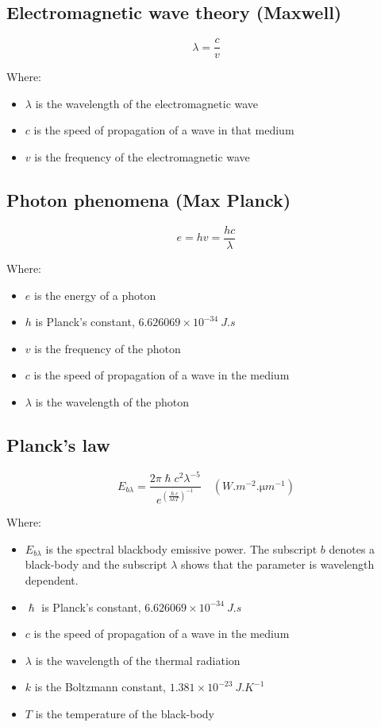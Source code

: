 \documentclass[11pt]{article}
\begin{document}
\subsection{Electromagnetic wave theory (Maxwell)}
\label{sec:orge55de04}
\[\lambda = \frac{c}{v}\]

Where:
\begin{itemize}
\item \(\lambda\) is the wavelength of the electromagnetic wave
\item \(c\) is the speed of propagation of a wave in that medium
\item \(v\) is the frequency of the electromagnetic wave
\end{itemize}
\subsection{Photon phenomena (Max Planck)}
\label{sec:org22568f9}
\[e = hv = \frac{hc}{\lambda}\]

Where:
\begin{itemize}
\item \(e\) is the energy of a photon
\item \(h\) is Planck's constant, \(6.626069 \times 10^{-34} \ \unit{J.s}\)
\item \(v\) is the frequency of the photon
\item \(c\) is the speed of propagation of a wave in the medium
\item \(\lambda\) is the wavelength of the photon
\end{itemize}
\subsection{Planck's law}
\label{sec:org488fbee}
\[E_{b \lambda} = \frac{2 \pi \hslash c^2 \lambda^{-5}}{e^{\left(\frac{\hslash c}{\lambda k T} \right)^{-1}}} \quad (\unit{W.m^{-2}.\micro m^{-1}})\]

Where:
\begin{itemize}
\item \(E_{b \lambda}\) is the spectral blackbody emissive power. The subscript \(b\) denotes a black-body and the subscript \(\lambda\) shows that the parameter is wavelength dependent.
\item \(\hslash\) is Planck's constant, \(6.626069 \times 10^{-34} \ \unit{J.s}\)
\item \(c\) is the speed of propagation of a wave in the medium
\item \(\lambda\) is the wavelength of the thermal radiation
\item \(k\) is the Boltzmann constant, \(1.381 \times 10^{-23} \ \unit{J.K^{-1}}\)
\item \(T\) is the temperature of the black-body
\end{itemize}
\end{document}
